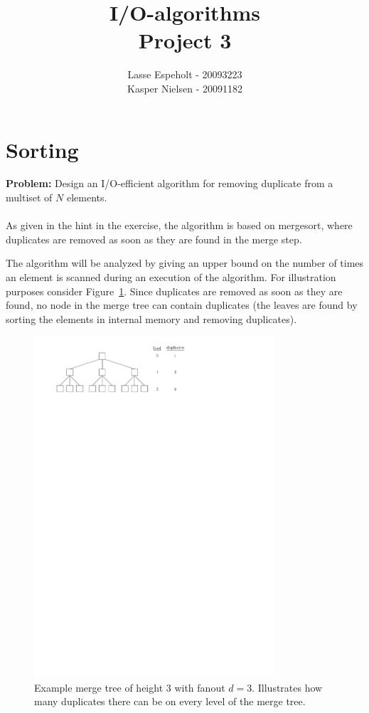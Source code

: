 \documentclass[a4paper,12pt]{article}
\begin{document}
\title{I/O-algorithms\\Project 3}

\author{Lasse Espeholt - 20093223\\
Kasper Nielsen - 20091182\\}

\maketitle

\pagebreak{}\tableofcontents{}\pagebreak{}

\section{Sorting}
\textbf{Problem:} Design an I/O-efficient algorithm for removing duplicate from a multiset of $N$ elements.
\\
\\As given in the hint in the exercise, the algorithm is based on mergesort, where duplicates are removed as soon as they are found in the merge step.

The algorithm will be analyzed by giving an upper bound on the number of times an element is scanned during an execution of the algorithm. For illustration purposes consider Figure~\ref{fig:sorting:mergetree}. Since duplicates are removed as soon as they are found, no node in the merge tree can contain duplicates (the leaves are found by sorting the elements in internal memory and removing duplicates).

\begin{figure}[h!]
  \centering
  \includegraphics[width=0.8\textwidth]{images/mergetree}
  \caption{Example merge tree of height $3$ with fanout $d = 3$. Illustrates how many duplicates there can be on every level of the merge tree.}
  \label{fig:sorting:mergetree}
\end{figure}
\end{document}
